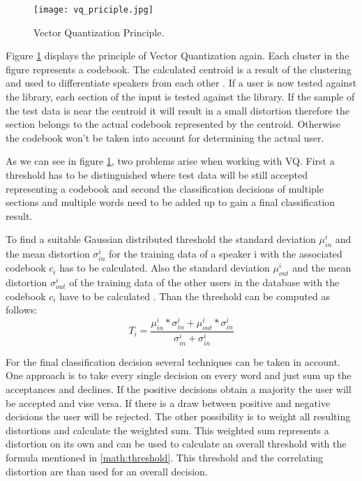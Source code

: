 \documentclass[12pt]{article}
\begin{document}
\begin{figure}[h!]
	\texttt{[image: vq\_priciple.jpg]}
	\caption[Vector Quantization Principle Taken from: \cite{vq_2}]{Vector Quantization Principle.}
	\label{fig:vq}
\end{figure}

Figure \ref{fig:vq} displays the principle of Vector Quantization again. Each cluster in the figure represents a codebook. The calculated centroid is a result of the clustering and used to differentiate speakers from each other . If a user is now tested against the library, each section of the input is tested against the library. If the sample of the test data is near the centroid it will result in a small distortion therefore the section belongs to the actual codebook represented by the centroid. Otherwise the codebook won't be taken into account for determining the actual user. \cite{vq_2} 

As we can see in figure \ref{fig:vq}, two problems arise when working with VQ. First a threshold has to be distinguished where test data will be still accepted representing a codebook and second the classification decisions of multiple sections and multiple words   need to be added up to gain a final classification result.
\newpage

To find a suitable Gaussian distributed threshold the standard deviation \(\mu_{in}^i\) and the mean distortion \(\sigma_{in}^i\) for the training data of a speaker i with the associated codebook \(c_{i}\) has to be calculated.  Also the  standard deviation \(\mu_{out}^i\) and the mean distortion \(\sigma_{out}^i\) of the training data of the other users in the database  with the codebook \(c_{i}\)  have to be calculated .\cite{vq} Than the threshold can be computed as follows:
 \begin{equation}
	T_{i}=\frac{{\mu_{in}^i}*{\sigma_{in}^i}+{\mu_{out}^i}*{\sigma_{in}^i}}{{\sigma_{in}^i}+{\sigma_{in}^i}}
	\label{math:threshold}
\end{equation}

For the final classification decision several techniques can be taken in account. One approach is to take every single decision on every word and just sum up the acceptances and declines. If the positive decisions obtain a majority the user will be accepted and vise versa. If there is a draw between positive and negative decisions the user will be rejected. The other possibility is to weight all resulting distortions and calculate the weighted sum. This weighted sum represents a distortion on its own and can be used to calculate an overall threshold with the formula mentioned in \ref{math:threshold}. This threshold and the correlating distortion are than used for an overall decision.\cite{vq}
\end{document}
